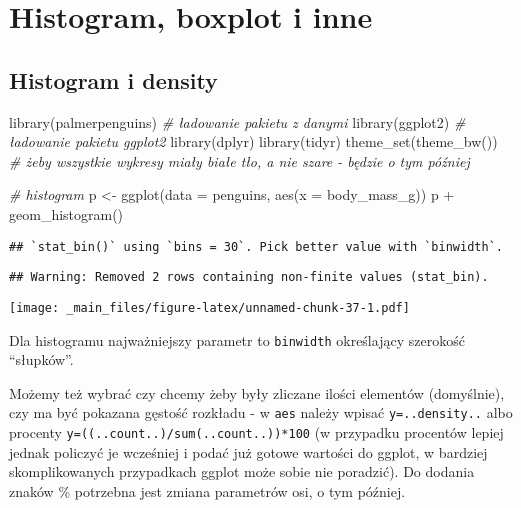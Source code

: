 \documentclass[
]{book}
\newenvironment{Shaded}{\begin{snugshade}}{\end{snugshade}}
\newcommand{\AttributeTok}[1]{\textcolor[rgb]{0.77,0.63,0.00}{#1}}
\newcommand{\CommentTok}[1]{\textcolor[rgb]{0.56,0.35,0.01}{\textit{#1}}}
\newcommand{\FunctionTok}[1]{\textcolor[rgb]{0.00,0.00,0.00}{#1}}
\newcommand{\NormalTok}[1]{#1}
\newcommand{\OtherTok}[1]{\textcolor[rgb]{0.56,0.35,0.01}{#1}}
\newcommand{\SpecialCharTok}[1]{\textcolor[rgb]{0.00,0.00,0.00}{#1}}
\begin{document}
\hypertarget{histogram-boxplot-i-inne}{%
\section{Histogram, boxplot i inne}\label{histogram-boxplot-i-inne}}

\hypertarget{histogram-i-density}{%
\subsection{Histogram i density}\label{histogram-i-density}}

\begin{Shaded}
\begin{Highlighting}[]
\FunctionTok{library}\NormalTok{(palmerpenguins) }\CommentTok{\# ładowanie pakietu z danymi}
\FunctionTok{library}\NormalTok{(ggplot2) }\CommentTok{\# ładowanie pakietu ggplot2}
\FunctionTok{library}\NormalTok{(dplyr)}
\FunctionTok{library}\NormalTok{(tidyr)}
\FunctionTok{theme\_set}\NormalTok{(}\FunctionTok{theme\_bw}\NormalTok{()) }\CommentTok{\# żeby wszystkie wykresy miały białe tło, a nie szare {-} będzie o tym później}
\end{Highlighting}
\end{Shaded}

\begin{Shaded}
\begin{Highlighting}[]
\CommentTok{\# histogram}
\NormalTok{p }\OtherTok{\textless{}{-}} \FunctionTok{ggplot}\NormalTok{(}\AttributeTok{data =}\NormalTok{ penguins, }\FunctionTok{aes}\NormalTok{(}\AttributeTok{x =}\NormalTok{ body\_mass\_g))}
\NormalTok{p }\SpecialCharTok{+} \FunctionTok{geom\_histogram}\NormalTok{()}
\end{Highlighting}
\end{Shaded}

\begin{verbatim}
## `stat_bin()` using `bins = 30`. Pick better value with `binwidth`.
\end{verbatim}

\begin{verbatim}
## Warning: Removed 2 rows containing non-finite values (stat_bin).
\end{verbatim}

\texttt{[image: \_main\_files/figure-latex/unnamed-chunk-37-1.pdf]}

Dla histogramu najważniejszy parametr to \texttt{binwidth} określający szerokość ``słupków''.

Możemy też wybrać czy chcemy żeby były zliczane ilości elementów (domyślnie), czy ma być pokazana gęstość rozkładu - w \texttt{aes} należy wpisać \texttt{y=..density..} albo procenty \texttt{y=((..count..)/sum(..count..))*100} (w przypadku procentów lepiej jednak policzyć je wcześniej i podać już gotowe wartości do ggplot, w bardziej skomplikowanych przypadkach ggplot może sobie nie poradzić). Do dodania znaków \% potrzebna jest zmiana parametrów osi, o tym później.
\end{document}
